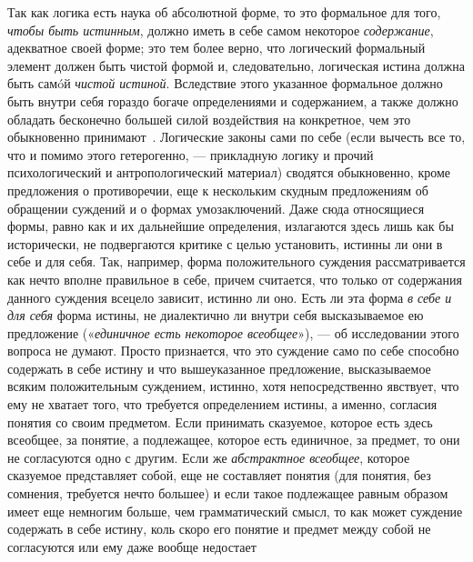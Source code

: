 \documentclass[twoside]{article}
\begin{document}
{{Так как логика есть наука об абсолютной форме, то это
формальное для того, {\em чтобы быть
истинным}, должно иметь в себе самом некоторое
{\em содержание},
адекватное своей форме; это тем более верно, что логический
формальный элемент должен быть чистой формой и, следовательно, логическая
истина должна быть самóй {\em чистой
истиной}. Вследствие этого указанное формальное должно быть
внутри себя гораздо богаче определениями и содержанием, а также должно
обладать бесконечно большей силой воздействия на конкретное, чем это
обыкновенно
принимают~\label{bkm:bm11}.
Логические законы сами по себе (если вычесть все то, что и
помимо этого гетерогенно, — прикладную логику и прочий
психологический и антропологический материал) сводятся обыкновенно, кроме
предложения о противоречии, еще к нескольким скудным предложениям об
обращении суждений и о формах умозаключений. Даже сюда относящиеся формы,
равно как и их дальнейшие определения, излагаются здесь лишь как бы
исторически, не подвергаются критике с целью установить, истинны ли они в
себе и для себя. Так, например, форма положительного суждения
рассматривается как нечто вполне правильное в себе, причем
считается, что только от содержания данного суждения всецело зависит,
истинно ли оно. Есть ли эта форма {\em в
себе и для себя} форма истины, не диалектично ли внутри себя
высказываемое ею предложение
(«{\em единичное есть некоторое
всеобщее}»), — об исследовании этого вопроса не думают. Просто 
признается, что это суждение само по себе способно содержать в
себе истину и что вышеуказанное предложение, высказываемое всяким
положительным суждением, истинно, хотя непосредственно явствует, что ему не
хватает того, что требуется определением истины, а именно, согласия понятия
со своим предметом. Если принимать сказуемое, которое есть здесь всеобщее,
за понятие, а подлежащее, которое есть единичное, за предмет, то они не
согласуются одно с другим. Если же
{\em абстрактное всеобщее},
которое сказуемое представляет собой, еще не составляет
понятия (для понятия, без сомнения, требуется нечто большее) и если такое
подлежащее равным образом имеет еще немногим больше, чем грамматический
смысл, то как может суждение содержать в себе истину, коль скоро его
понятие и предмет между собой не согласуются или ему даже вообще недостает
}}
\end{document}
